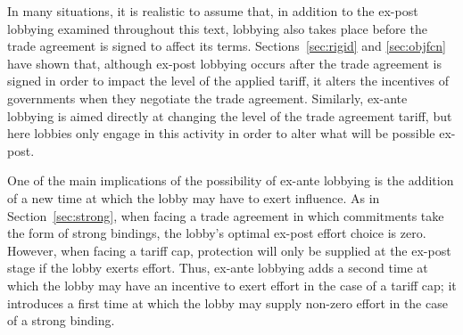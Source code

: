 

%
%




%

In many situations, it is realistic to assume that, in addition to the ex-post lobbying examined throughout this text, lobbying also takes place before the trade agreement is signed to affect its terms. Sections~\ref{sec:rigid} and \ref{sec:objfcn} have shown that, although ex-post lobbying occurs after the trade agreement is signed in order to impact the level of the applied tariff, it alters the incentives of governments when they negotiate the trade agreement. Similarly, ex-ante lobbying is aimed directly at changing the level of the trade agreement tariff, but here lobbies only engage in this activity in order to alter what will be possible ex-post.

One of the main implications of the possibility of ex-ante lobbying is the addition of a new time at which the lobby may have to exert influence. As in Section~\ref{sec:strong}, when facing a trade agreement in which commitments take the form of strong bindings, the lobby's optimal ex-post effort choice is zero. However, when facing a tariff cap, protection will only be supplied at the ex-post stage if the lobby exerts effort. Thus, ex-ante lobbying adds a second time at which the lobby may have an incentive to exert effort in the case of a tariff cap; it introduces a first time at which the lobby may supply non-zero effort in the case of a strong binding.

